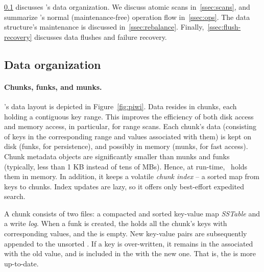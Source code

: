 
\cref{ssec:layout}  discusses \sys's data organization. 
We discuss atomic scans in~\cref{ssec:scans}, and summarize \sys's
normal (maintenance-free) operation flow  in~\cref{ssec:ops}.  
The data structure's maintenance is discussed in~\cref{ssec:rebalance}.
Finally,~\cref{ssec:flush-recovery} discusses data flushes and failure recovery.


\subsection{Data organization}
\label{ssec:layout}

\paragraph{Chunks, funks, and munks.}

\sys's data layout is depicted in Figure~\ref{fig:piwi}.
Data resides in chunks, each holding a contiguous key range.
This improves the efficiency of both disk access and memory access, in particular, for  range scans. 
Each chunk's data 
(consisting of keys in the corresponding range and values associated with them) 
is kept on disk (funks, for persistence), and possibly in memory (munks, for fast access). 
Chunk metadata objects are significantly smaller than munks and funks
(typically, less than 1 KB instead of tens of MBs). Hence, at run-time, \sys\ holds them in memory.
In addition, it keeps a volatile \emph{chunk index} -- a sorted map from keys to chunks. 
Index updates are lazy, so it offers only best-effort expedited search.

A chunk %
consists of two files:  a compacted and sorted  key-value map \emph{SSTable} %
and a write \emph{log}. When a funk is created, the  holds all the chunk's keys with corresponding values, and the   is empty.
New key-value pairs are subsequently appended to the unsorted . If a key is over-written, it remains in the  associated with the old value, and is included in the  with the new one.
That is, the  is more up-to-date.


